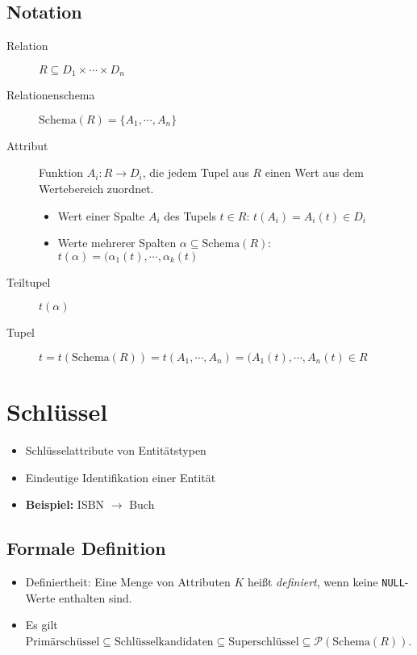 \documentclass[a4paper, 11pt, accentcolor = tud3b]{tudreport}
\newcommand{\Schema}{\text{Schema}}
\begin{document}
            \subsection{Notation} %
                \begin{description}
                	\item[Relation] \( R \subseteq D _ 1 \times \cdots \times D _ n \)
                	\item[Relationenschema] \( \Schema(R) = \{ A _ 1, \cdots, A _ n \} \)
                	\item[Attribut] Funktion \( A _ i : R \rightarrow D _ i \), die jedem Tupel aus \(R\) einen Wert aus dem Wertebereich zuordnet.
                		\begin{itemize}
                			\item Wert einer Spalte \(A_i\) des Tupels \( t \in R \): \( t(A_i) = A_i(t) \in D_i \)
                			\item Werte mehrerer Spalten \( \alpha \subseteq \Schema(R) \): \( t(\alpha) = (\alpha_1(t), \cdots, \alpha_k(t) \)
                		\end{itemize}
                	\item[Teiltupel] \(t(\alpha)\)
                	\item[Tupel] \( t = t(\Schema(R)) = t(A_1, \cdots, A_n) = (A_1(t), \cdots, A_n(t) \in R \)
                \end{description}

        \section{Schlüssel} %
            \begin{itemize}
            	\item Schlüsselattribute von Entitätstypen
            	\item Eindeutige Identifikation einer Entität
            	\item \textbf{Beispiel:} ISBN \(\rightarrow\) Buch
            \end{itemize}

            \subsection{Formale Definition} %
            	\begin{itemize}
            		\item Definiertheit: Eine Menge von Attributen \(K\) heißt \textit{definiert}, wenn keine \lstinline|NULL|-Werte enthalten sind.
            		\item Es gilt \( \text{Primärschüssel} \subseteq \text{Schlüsselkandidaten} \subseteq \text{Superschlüssel} \subseteq \mathcal{P}(\Schema(R)) \).
            	\end{itemize}
\end{document}
